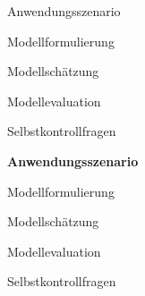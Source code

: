 \documentclass[
  8pt,
  ignorenonframetext,
]{beamer}
\begin{document}
\begin{frame}{}
\protect\hypertarget{section-3}{}
\large
{}
\vfill

Anwendungsszenario

Modellformulierung

Modellschätzung

Modellevaluation

Selbstkontrollfragen \vfill
\end{frame}

\begin{frame}{}
\protect\hypertarget{section-4}{}
\large
{}
\vfill

\textbf{Anwendungsszenario}

Modellformulierung

Modellschätzung

Modellevaluation

Selbstkontrollfragen \vfill
\end{frame}
\end{document}
